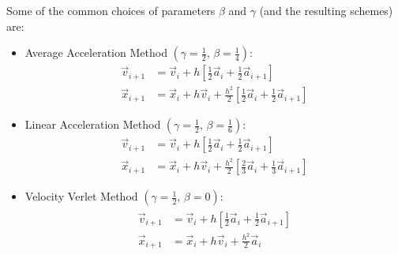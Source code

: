 \documentclass[../Main.tex]{subfiles}
\begin{document}
Some of the common choices of parameters $\beta$ and $\gamma$ (and the resulting schemes) are:
\begin{itemize}
	\item Average Acceleration Method $\left(\gamma = \frac{1}{2} \mbox{, } \beta = \frac{1}{4}\right)$:
\begin{align*}
	\vec{v}_{i+1} & = \vec{v}_{i} + h\left[\frac{1}{2}\vec{a}_{i} + \frac{1}{2}\vec{a}_{i+1}\right]\\
	\vec{x}_{i+1} & = \vec{x}_{i} + h\vec{v}_{i} + \frac{h^2}{2}\left[\frac{1}{2}\vec{a}_{i} +\frac{1}{2}\vec{a}_{i+1}\right]
\end{align*}
	\item Linear Acceleration Method $\left(\gamma = \frac{1}{2} \mbox{, } \beta = \frac{1}{6}\right)$:
\begin{align*}
	\vec{v}_{i+1} & = \vec{v}_{i} + h\left[\frac{1}{2}\vec{a}_{i} + \frac{1}{2}\vec{a}_{i+1}\right]\\
	\vec{x}_{i+1} & = \vec{x}_{i} + h\vec{v}_{i} + \frac{h^2}{2}\left[\frac{2}{3}\vec{a}_{i} +\frac{1}{3}\vec{a}_{i+1}\right]
\end{align*}
	\item Velocity Verlet Method $\left(\gamma = \frac{1}{2} \mbox{, } \beta = 0\right)$:
\begin{align}
	\begin{split}
	\vec{v}_{i+1} & = \vec{v}_{i} + h\left[\frac{1}{2}\vec{a}_{i} + \frac{1}{2}\vec{a}_{i+1}\right] \\
	\vec{x}_{i+1} & = \vec{x}_{i} + h\vec{v}_{i} + \frac{h^2}{2}\vec{a}_{i}
	\end{split} \label{eqn:velocity_verlet}
\end{align}
\end{itemize}
\end{document}
